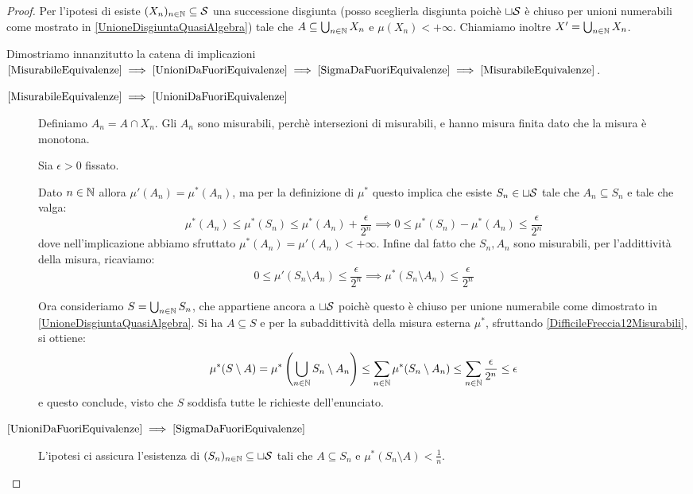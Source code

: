 \begin{proof}
	Per l'ipotesi di \sigfin[ezza] esiste $(X_n)_{n\in\N}\subseteq \S$ una successione disgiunta (posso sceglierla disgiunta poichè $\sqcup\S$ è chiuso per unioni numerabili come mostrato in \cref{UnioneDisgiuntaQuasiAlgebra}) tale che $A\subseteq \bigcup_{n\in\N}X_n$ e $\mu(X_n)<+\infty$. Chiamiamo inoltre $X'=\bigcup_{n\in\N}X_n$.
	
	Dimostriamo innanzitutto la catena di implicazioni
	$\text{\ref{MisurabileEquivalenze}}\implies
	\text{\ref{UnioniDaFuoriEquivalenze}}\implies
	\text{\ref{SigmaDaFuoriEquivalenze}}\implies
	\text{\ref{MisurabileEquivalenze}}$.
	\newcommand{\ImplicationProof}[2]{$\text{\ref{#1}}\implies\text{\ref{#2}}$}%
	\begin{description}
		\item[\ImplicationProof{MisurabileEquivalenze}{UnioniDaFuoriEquivalenze}] Definiamo $A_n=A\cap X_n$. Gli $A_n$ sono misurabili, perchè intersezioni di misurabili, e hanno misura finita dato che la misura è monotona.
		
		Sia $\epsilon>0$ fissato.
		
		Dato $n\in\N$ allora $\mu'(A_n)=\mu^*(A_n)$, ma per la definizione di $\mu^*$ questo implica che esiste $S_n\in\sqcup \S$ tale che $A_n\subseteq S_n$ e tale che valga:
		\begin{equation*}
			\mu^*(A_n)\le \mu^*(S_n) \le \mu^*(A_n)+\frac\epsilon{2^n}\implies
			0\le \mu^*(S_n)-\mu^*(A_n)\le \frac\epsilon{2^n}
		\end{equation*}
		dove nell'implicazione abbiamo sfruttato $\mu^*(A_n)=\mu'(A_n)<+\infty$.
		Infine dal fatto che $S_n,A_n$ sono misurabili, per l'addittività della misura, ricaviamo:
		\begin{equation}\label{DifficileFreccia12Misurabili}
			0\le \mu'(S_n\setminus A_n) \le \frac\epsilon{2^n} \implies \mu^*(S_n\setminus A_n)\le \frac\epsilon{2^n}
		\end{equation}
		
		Ora consideriamo $S=\bigcup_{n\in\N}S_n$, che appartiene ancora a $\sqcup\S$ poichè questo è chiuso per unione numerabile come dimostrato in \cref{UnioneDisgiuntaQuasiAlgebra}. Si ha $A\subseteq S$ e per la subaddittività della misura esterna  $\mu^*$, sfruttando \cref{DifficileFreccia12Misurabili}, si ottiene:
		\begin{equation*}
			\mu^*(S\setminus A)=\mu^*\left(\bigcup_{n\in\N}S_n\setminus A_n\right)\le
			\sum_{n\in\N}\mu^*(S_n\setminus A_n)\le\sum_{n\in\N}\frac\epsilon{2^n}\le \epsilon
		\end{equation*}
		e questo conclude, visto che $S$ soddisfa tutte le richieste dell'enunciato.
		\item[\ImplicationProof{UnioniDaFuoriEquivalenze}{SigmaDaFuoriEquivalenze}] L'ipotesi ci assicura l'esistenza di $(S_n)_{n\in\N}\subseteq \sqcup \S$ tali che $A\subseteq S_n$ e $\mu^*(S_n\setminus A)<\frac1n$.
		

\end{description}
\end{proof}
